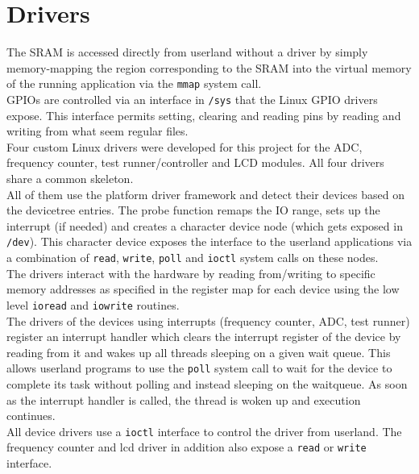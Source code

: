 \newpage
\section{Drivers}
The SRAM is accessed directly from userland without a driver by simply memory-mapping the
region corresponding to the SRAM into the virtual memory of the running application via the
\texttt{mmap} system call.
\\

GPIOs are controlled via an interface in \texttt{/sys} that the Linux GPIO drivers expose. This
interface permits setting, clearing and reading pins by reading and writing from what seem
regular files.
\\

Four custom Linux drivers were developed for this project for the ADC, frequency counter, test
runner/controller and LCD modules. All four drivers share a common skeleton.
\\

All of them use the platform driver framework and detect their devices based on the devicetree
entries. The probe function remaps the IO range, sets up the interrupt (if needed) and
creates a character device node (which gets exposed in \texttt{/dev}). This character device
exposes the interface to the userland applications via a combination of \texttt{read},
\texttt{write}, \texttt{poll} and \texttt{ioctl} system calls on these nodes.
\\

The drivers interact with the hardware by reading from/writing to specific memory addresses
as specified in the register map for each device using the low level \texttt{ioread} and
\texttt{iowrite} routines.
\\

The drivers of the devices using interrupts (frequency counter, ADC, test runner) register
an interrupt handler which clears the interrupt register of the device by reading from it
and wakes up all threads sleeping on a given wait queue. This allows userland programs
to use the \texttt{poll} system call to wait for the device to complete its task without
polling and instead sleeping on the waitqueue. As soon as the interrupt handler is called,
the thread is woken up and execution continues.
\\

All device drivers use a \texttt{ioctl} interface to control the driver from userland.
The frequency counter and lcd driver in addition also expose a \texttt{read} or \texttt{write}
interface.

